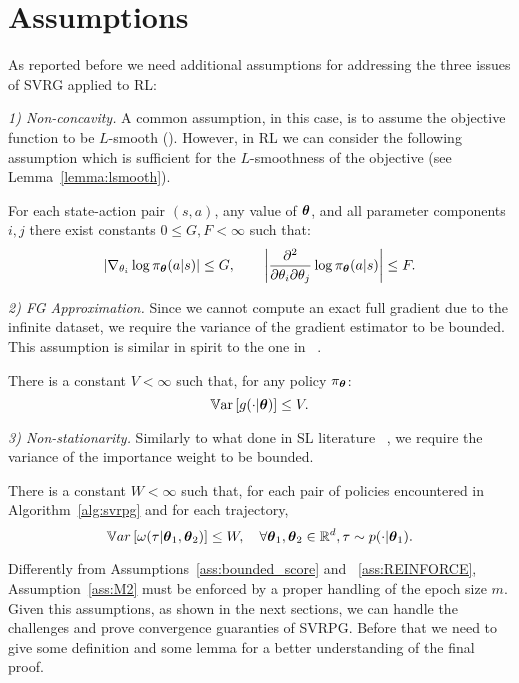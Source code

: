 \section{Assumptions}\label{sec:assumption}

As reported before we need additional assumptions for addressing the three issues of \acs{SVRG} applied to \acs{RL}:

\textit{1) Non-concavity.} A common assumption, in this case, is to assume the objective function to be $L$-smooth (\cite{reddi2016stochastic,allen2016variance}).
However, in \acs{RL} we can consider the following assumption which is sufficient for the $L$-smoothness of the objective (see Lemma~\ref{lemma:lsmooth}).

\begin{assumption}\label{ass:bounded_score}
	For each state-action pair $(s,a)$, any value of $\boldsymbol{\theta}$, and all parameter components $i,j$ there exist constants $0 \leq G,F<\infty$ such that:
	\[
	\left|\nabla_{\theta_i}\log\pi_{\boldsymbol{\theta}}(a\vert s)\right| \leq G, \qquad
	\left|\frac{\partial^2}{\partial\theta_i\partial\theta_j}\log\pi_{\boldsymbol{\theta}}(a \vert s)\right| \leq F.
	\]
\end{assumption}

\textit{2) FG Approximation.}
Since we cannot compute an exact full gradient due to the infinite dataset, we require the variance of the gradient estimator to be bounded.
This assumption is similar in spirit to the one in ~\cite{harikandeh2015stopwasting}.
\begin{assumption}\label{ass:REINFORCE}
	There is a constant $V<\infty$ such that, for any policy $\pi_{\boldsymbol{\theta}}$:
	\[
	\operatorname*{\mathbb{V}ar}\left[g(\cdot\vert\boldsymbol{\theta})\right] \leq V.
	\]
\end{assumption}

\textit{3) Non-stationarity.} 
Similarly to what done in \acs{SL} literature ~\citep{cortes2010learning}, we require the variance of the importance weight to be bounded.
\begin{assumption}\label{ass:M2}
	There is a constant $W<\infty$ such that, for each pair of policies encountered in Algorithm~\ref{alg:svrpg} and for each trajectory,
	\[
	\mathbb{V}ar\left[\omega(\tau| \boldsymbol{\theta}_1, \boldsymbol{\theta}_2)\right] \leq W, \quad \forall \boldsymbol{\theta}_1,\boldsymbol{\theta}_2 \in \mathbb R^d , \tau \sim p(\cdot|\boldsymbol{\theta}_1).
	\]
\end{assumption}
Differently from Assumptions~\ref{ass:bounded_score} and ~\ref{ass:REINFORCE}, Assumption~\ref{ass:M2} must be enforced by a proper handling of the epoch size $m$.\newline
Given this assumptions, as shown in the next sections, we can handle the challenges and prove convergence guaranties of \acs{SVRPG}. Before that we need to give some definition and some lemma for a better  understanding of the final proof.

